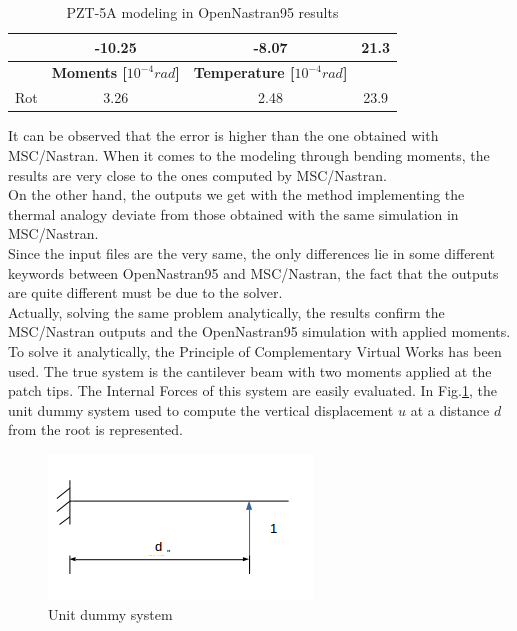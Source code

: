 \documentclass[twocolumn,a4paper,10pt,english]{article}
\begin{document}
\begin{table}[t]
\begin{tabular}{|c|c|c|c|}
	& -10.25                                                    & -8.07                                                         & 21.3                                  \\ \hline
	\multicolumn{1}{|l|}{}       & \multicolumn{1}{l|}{\textbf{Moments {[}$10^{-4} rad${]}}} & \multicolumn{1}{l|}{\textbf{Temperature {[}$10^{-4} rad${]}}} & \multicolumn{1}{l|}{}                \\ \hline
	\multicolumn{1}{|c|}{Rot}    & 3.26                                                      & 2.48                                                          & 23.9                                  \\ \hline
\end{tabular}
\caption{PZT-5A modeling in OpenNastran95 results}
\label{tab:open}
\end{table}
It can be observed that the error is higher than the one obtained with MSC/Nastran. When it comes to the modeling through bending moments, the results are very close to the ones computed by MSC/Nastran. \\
On the other hand, the outputs we get with the method implementing the thermal analogy deviate from those obtained with the same simulation in MSC/Nastran. \\
Since the input files are the very same, the only differences lie in some different keywords between OpenNastran95 and MSC/Nastran, the fact that the outputs are quite different must be due to the solver.\\
Actually, solving the same problem analytically, the results confirm the MSC/Nastran outputs and the OpenNastran95 simulation with applied moments. To solve it analytically, the Principle of Complementary Virtual Works has been used. The true system is the cantilever beam with two moments applied at the patch tips. The Internal Forces of this system are easily evaluated. In Fig.\ref{fig:dummy}, the unit dummy system used to compute the vertical displacement $u$ at a distance $d$ from the root is represented.
\begin{figure}[htp]
	\centering
	\includegraphics[width=0.6\linewidth]{images/dummy.png}
	\caption{Unit dummy system}
	\label{fig:dummy}
\end{figure}\\
\end{document}

